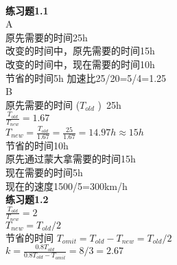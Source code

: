 \documentclass{article}
\begin{document}
\begin{CJK}{UTF8}{uyhei}
\begin{CJK}{UTF8}{gkai}
\end{CJK}
\textcolor[rgb]{1,0,0}{\begin{math} \end{math} \begin{math}			\end{math}} \\[0cm]
\textbf{练习题1.1}\\[0.1cm]
A\\[0.1cm]
原先需要的时间25h \\[0.1cm]
改变的时间中，原先需要的时间15h \\[0.1cm]
改变的时间中，现在需要的时间10h \\[0.1cm]
节省的时间5h
加速比25/20=5/4=1.25 \\[0.3cm]
B\\[0.1cm]
原先需要的时间 (\begin{math} T_{old} \end{math} )\ 25h \\[0.3cm]
\begin{math} \frac{\textstyle T_{old}}{\textstyle T_{new}}=1.67 \end{math} \\[0.3cm]
\begin{math} T_{new}=\frac{T_{old}}{1.67}=\frac{25}{1.67}=14.97h \approx{}15h  \end{math} \\[0.3cm]
节省的时间10h \\[0.1cm]
原先通过蒙大拿需要的时间15h \\[0.1cm]
现在需要的时间5h \\[0.1cm]
现在的速度1500/5=300km/h \\[0.3cm]
\textbf{练习题1.2} \\[0.2cm]
\begin{math} \frac{\textstyle T_{old}}{\textstyle T_{new}}=2 \end{math}\\[0.2cm]
\begin{math} T_{new}=T_{old}/2 \end{math}\\[0.2cm]
节省的时间
\begin{math} T_{omit}=T_{old}-T_{new}=T_{old}/2 \end{math}\\[0.2cm]
\begin{math} k=\frac{0.8T_{old}}{0.8T_{old}-T_{omit}}=8/3=2.67 \end{math}\\[0.3cm]

\end{CJK}
\end{document}
